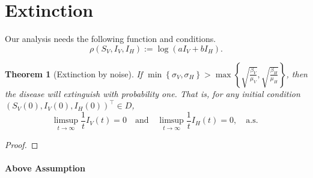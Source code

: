 \documentclass{amsart}
\theoremstyle{plain}
\newtheorem{theorem}{Theorem}
\theoremstyle{definition}
\begin{document}
    \section{Extinction}
        Our analysis needs the following function and conditions.
        \begin{equation}
            \rho (S_V, I_V, I_H) := \log (a I_V + b I_H) .
        \end{equation}
%
%
%
%
%
        \begin{theorem}[Extinction by noise]
                If 
                $
                    \displaystyle
                    \min
                        \left \{
                              \sigma_V, \sigma_H 
                        \right\} 
                        > 
                    \max 
                        \left \{
                            \sqrt{\frac{\beta_V}{\mu_V}},
                            \sqrt{\frac{\beta_H}{\mu_H}}
                        \right \}
                $,
                then the disease will extinguish with probability one.  That is,
                for any initial condition $(S_V(0), I_V(0), I_H(0)) ^{\top} \in 
                D$,
                $$
                    \limsup_{t \to \infty} 
                        \frac{1}{t} I_V(t) = 0 
                        \quad \text{and} \quad
                    \limsup_{t \to \infty} 
                        \frac{1}{t} I_H(t) = 0, \quad 
                        \text{
                           a.s.
                        }
                $$
        \end{theorem}        
        \begin{proof}
        
        \end{proof}
%
%
%
%
    \paragraph{Above Assumption}
\end{document}
